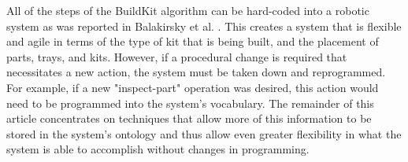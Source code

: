 All of the steps of the {\sc BuildKit} algorithm can be hard-coded into a robotic
system as was reported in Balakirsky et al. \cite{Balakirsky2013}. This
creates a system that is flexible and agile in terms of the type of kit that
is being built, and the placement of parts, trays, and kits. However, if
a procedural change is required that necessitates a new action, the system
must be taken down and reprogrammed. For example, if a new "inspect-part"
operation was desired, this action would need to be programmed into the system's
vocabulary. The remainder of this article concentrates on techniques that
allow more of this information to be stored in the system's ontology and thus
allow even greater flexibility in what the system is able to accomplish without
changes in programming.
